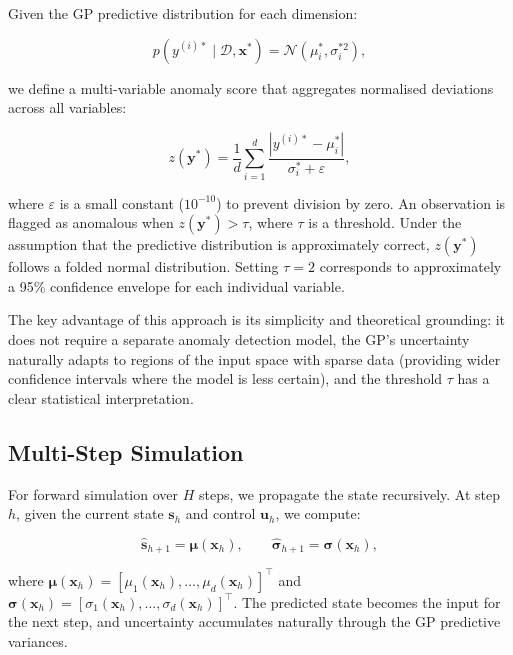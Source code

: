 \documentclass[conference]{IEEEtran}
\begin{document}
Given the GP predictive distribution for each dimension:

\begin{equation}
p(y^{(i)*} \mid \mathcal{D}, \mathbf{x}^*) = \mathcal{N}(\mu_i^*, \sigma_i^{*2}),
\label{eq:pred_dist}
\end{equation}

we define a multi-variable anomaly score that aggregates normalised deviations across all variables:

\begin{equation}
z(\mathbf{y}^*) = \frac{1}{d} \sum_{i=1}^d \frac{|y^{(i)*} - \mu_i^*|}{\sigma_i^* + \varepsilon},
\label{eq:anomaly_score}
\end{equation}

where $\varepsilon$ is a small constant ($10^{-10}$) to prevent division by zero. An observation is flagged as anomalous when $z(\mathbf{y}^*) > \tau$, where $\tau$ is a threshold. Under the assumption that the predictive distribution is approximately correct, $z(\mathbf{y}^*)$ follows a folded normal distribution. Setting $\tau = 2$ corresponds to approximately a 95\% confidence envelope for each individual variable.

The key advantage of this approach is its simplicity and theoretical grounding: it does not require a separate anomaly detection model, the GP's uncertainty naturally adapts to regions of the input space with sparse data (providing wider confidence intervals where the model is less certain), and the threshold $\tau$ has a clear statistical interpretation.

\subsection{Multi-Step Simulation}

For forward simulation over $H$ steps, we propagate the state recursively. At step $h$, given the current state $\mathbf{s}_h$ and control $\mathbf{u}_h$, we compute:

\begin{equation}
\hat{\mathbf{s}}_{h+1} = \boldsymbol{\mu}(\mathbf{x}_h), \qquad
\hat{\boldsymbol{\sigma}}_{h+1} = \boldsymbol{\sigma}(\mathbf{x}_h),
\label{eq:sim_step}
\end{equation}

where $\boldsymbol{\mu}(\mathbf{x}_h) = [\mu_1(\mathbf{x}_h), \dots, \mu_d(\mathbf{x}_h)]^\top$ and $\boldsymbol{\sigma}(\mathbf{x}_h) = [\sigma_1(\mathbf{x}_h), \dots, \sigma_d(\mathbf{x}_h)]^\top$. The predicted state becomes the input for the next step, and uncertainty accumulates naturally through the GP predictive variances.
\end{document}
